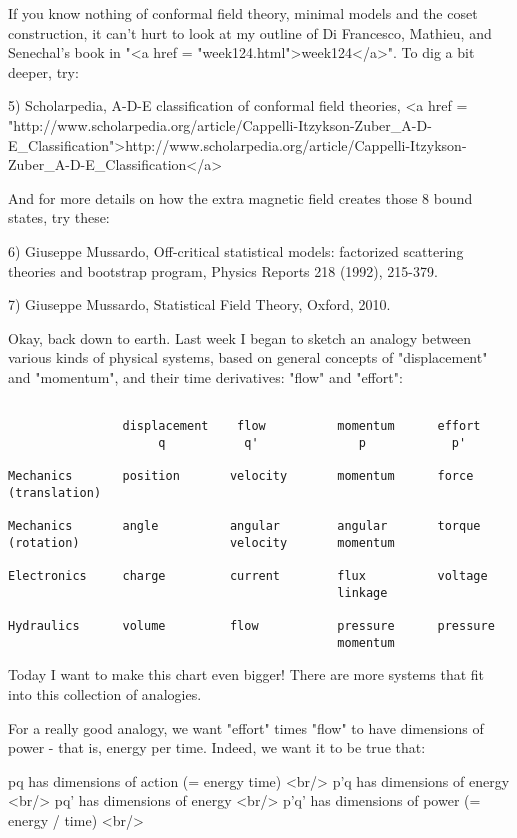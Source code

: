If you know nothing of conformal field theory, minimal models and the
coset construction, it can't hurt to look at my outline of Di
Francesco, Mathieu, and Senechal's book in "<a href =
"week124.html">week124</a>".  To dig a bit deeper, try:

5) Scholarpedia, A-D-E classification of conformal field theories,
<a href = "http://www.scholarpedia.org/article/Cappelli-Itzykson-Zuber_A-D-E_Classification">http://www.scholarpedia.org/article/Cappelli-Itzykson-Zuber_A-D-E_Classification</a>
 
And for more details on how the extra magnetic field creates those 8
bound states, try these:

6) Giuseppe Mussardo, Off-critical statistical models: factorized
scattering theories and bootstrap program, Physics Reports 218
(1992), 215-379.  

7) Giuseppe Mussardo, Statistical Field Theory, Oxford, 2010.

Okay, back down to earth.  Last week I began to sketch an analogy
between various kinds of physical systems, based on general concepts
of "displacement" and "momentum", and their time
derivatives: "flow" and "effort":


\begin{verbatim}

                displacement    flow          momentum      effort
                     q           q'              p            p'

Mechanics       position       velocity       momentum      force
(translation)

Mechanics       angle          angular        angular       torque
(rotation)                     velocity       momentum

Electronics     charge         current        flux          voltage
                                              linkage

Hydraulics      volume         flow           pressure      pressure
                                              momentum

\end{verbatim}
    

Today I want to make this chart even bigger!  There are more systems that
fit into this collection of analogies.

For a really good analogy, we want "effort" times
"flow" to have dimensions of power - that is, energy per
time.  Indeed, we want it to be true that:

pq   has dimensions of action (= energy \times  time) <br/>
p'q  has dimensions of energy <br/>
pq'  has dimensions of energy <br/>
p'q' has dimensions of power (= energy / time) <br/>


